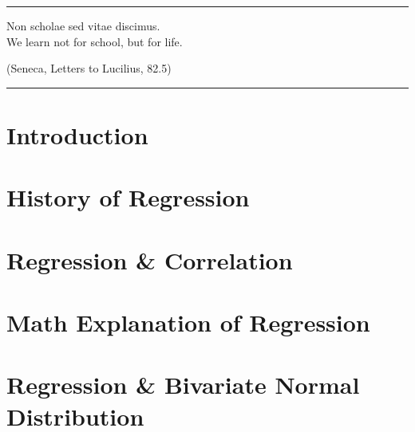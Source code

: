 \documentclass[a4paper]{article}
\begin{document}
\courseheader
{}

\rule{\textwidth}{1pt}
Non scholae sed vitae discimus.\\
We learn not for school, but for life. \\
\begin{flushright}
  (Seneca, Letters to Lucilius, 82.5)
\end{flushright}
\rule{\textwidth}{1pt}
\vspace{2em}

\section{Introduction}
\lipsum[1] %

\section{History of Regression}
\lipsum[2] %

\section{Regression \& Correlation}
\lipsum[3] %

\section{Math Explanation of Regression}
\lipsum[4] %

\section{Regression \& Bivariate Normal Distribution}
\lipsum[5] %
\end{document}
